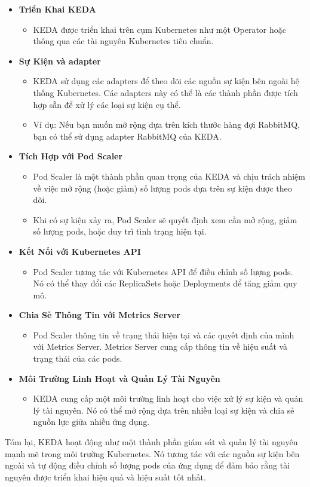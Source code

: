 \begin{itemize}
    \item \textbf{Triển Khai KEDA}
    \begin{itemize}
        \item KEDA được triển khai trên cụm Kubernetes như một Operator hoặc thông qua các tài nguyên Kubernetes tiêu chuẩn.
    \end{itemize}
    \item \textbf{Sự Kiện và adapter}
    \begin{itemize}
        \item KEDA sử dụng các adapters để theo dõi các nguồn sự kiện bên ngoài hệ thống Kubernetes. Các adapters này có thể là các thành phần được tích hợp sẵn để xử lý các loại sự kiện cụ thể.
        \item Ví dụ: Nếu bạn muốn mở rộng dựa trên kích thước hàng đợi RabbitMQ, bạn có thể sử dụng adapter RabbitMQ của KEDA.
    \end{itemize}
    \item \textbf{Tích Hợp với Pod Scaler}
    \begin{itemize}
        \item Pod Scaler là một thành phần quan trọng của KEDA và chịu trách nhiệm về việc mở rộng (hoặc giảm) số lượng pods dựa trên sự kiện được theo dõi.
        \item Khi có sự kiện xảy ra, Pod Scaler sẽ quyết định xem cần mở rộng, giảm số lượng pods, hoặc duy trì tình trạng hiện tại.
    \end{itemize}
    \item \textbf{Kết Nối với Kubernetes API}
    \begin{itemize}
        \item Pod Scaler tương tác với Kubernetes API để điều chỉnh số lượng pods. Nó có thể thay đổi các ReplicaSets hoặc Deployments để tăng giảm quy mô.
    \end{itemize}
    \item \textbf{Chia Sẻ Thông Tin với Metrics Server}
    \begin{itemize}
        \item Pod Scaler thông tin về trạng thái hiện tại và các quyết định của mình với Metrics Server. Metrics Server cung cấp thông tin về hiệu suất và trạng thái của các pods.
    \end{itemize}
    \item \textbf{Môi Trường Linh Hoạt và Quản Lý Tài Nguyên}
    \begin{itemize}
        \item KEDA cung cấp một môi trường linh hoạt cho việc xử lý sự kiện và quản lý tài nguyên. Nó có thể mở rộng dựa trên nhiều loại sự kiện và chia sẻ nguồn lực giữa nhiều ứng dụng.
    \end{itemize}
\end{itemize}
Tóm lại, KEDA hoạt động như một thành phần giám sát và quản lý tài nguyên mạnh mẽ trong môi trường Kubernetes. Nó tương tác với các nguồn sự kiện bên ngoài và tự động điều chỉnh số lượng pods của ứng dụng để đảm bảo rằng tài nguyên được triển khai hiệu quả và hiệu suất tốt nhất.
